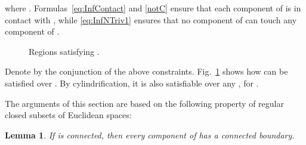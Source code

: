 \documentclass{article}
\newtheorem{lemma}[theorem]{Lemma}
\begin{document}
where . Formulas~\eqref{eq:InfContact} and
\eqref{notC} ensure that each component of  is in contact with
, while \eqref{eq:InfNTriv1} ensures that no component of
 can touch any component of .
\begin{figure}[h]
\begin{center}
\end{center}
\vspace*{-2mm}
\caption{Regions satisfying .}\label{fig:InfCmpSat}	
\end{figure}

Denote by  the conjunction of the above
constraints. Fig.~\ref{fig:InfCmpSat} shows how  can be
satisfied over . By cylindrification, it is also satisfiable
over any , for .

The arguments of this section are based on the following
property of regular closed subsets of Euclidean spaces:
\begin{lemma}\label{lma:ourNewman}
If  is connected, then every component of  
has a connected boundary.
\end{lemma}
\end{document}
